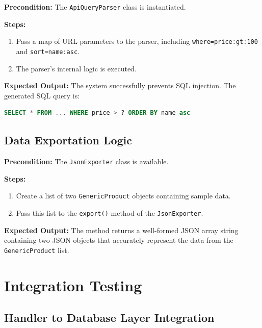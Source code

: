 \documentclass[12pt, a4paper]{report}
\begin{document}
\noindent\textbf{Precondition:} The \lstinline|ApiQueryParser| class is instantiated.

\noindent\textbf{Steps:}
\begin{enumerate}
    \item Pass a map of URL parameters to the parser, including \lstinline|where=price:gt:100| and \lstinline|sort=name:asc|.
    \item The parser's internal logic is executed.
\end{enumerate}

\noindent\textbf{Expected Output:}
The system successfully prevents SQL injection. The generated SQL query is:
\begin{lstlisting}[language=SQL, basicstyle=\ttfamily\small, breaklines=true]
SELECT * FROM ... WHERE price > ? ORDER BY name asc
\end{lstlisting}
\subsection{Data Exportation Logic}

\noindent\textbf{Precondition:} The \lstinline|JsonExporter| class is available.

\noindent\textbf{Steps:}
\begin{enumerate}
    \item Create a list of two \lstinline|GenericProduct| objects containing sample data.
    \item Pass this list to the \lstinline|export()| method of the \lstinline|JsonExporter|.
\end{enumerate}

\noindent\textbf{Expected Output:} The method returns a well-formed JSON array string containing two JSON objects that accurately represent the data from the \lstinline|GenericProduct| list.

\section{Integration Testing}

\subsection{Handler to Database Layer Integration}
\end{document}
